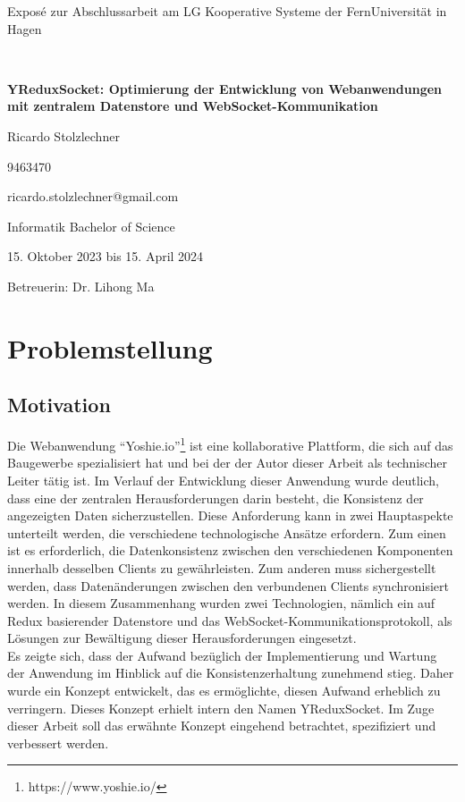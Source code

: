 \documentclass[12pt]{article} %
\begin{document}
\begin{center}
   \baselineskip
   
   Exposé zur Abschlussarbeit am LG Kooperative Systeme der FernUniversität in Hagen
   
   ~
   
   \LARGE\bfseries 
    YReduxSocket: Optimierung der Entwicklung von Webanwendungen mit zentralem Datenstore und WebSocket-Kommunikation

   \large
   Ricardo Stolzlechner
   
   9463470
   
   ricardo.stolzlechner@gmail.com
   
   Informatik Bachelor of Science
   
   15. Oktober 2023 bis 15. April 2024
   
   Betreuerin: Dr. Lihong Ma
\end{center}

\section{Problemstellung}

\subsection{Motivation}
\label{motivation}

Die Webanwendung "`Yoshie.io"'\footnote{https://www.yoshie.io/} ist eine kollaborative Plattform, die sich auf das Baugewerbe spezialisiert hat und bei der der Autor dieser Arbeit als technischer Leiter tätig ist. Im Verlauf der Entwicklung dieser Anwendung wurde deutlich, dass eine der zentralen Herausforderungen darin besteht, die Konsistenz der angezeigten Daten sicherzustellen. Diese Anforderung kann in zwei Hauptaspekte unterteilt werden, die verschiedene technologische Ansätze erfordern. Zum einen ist es erforderlich, die Datenkonsistenz zwischen den verschiedenen Komponenten innerhalb desselben Clients zu gewährleisten. Zum anderen muss sichergestellt werden, dass Datenänderungen zwischen den verbundenen Clients synchronisiert werden. In diesem Zusammenhang wurden zwei Technologien, nämlich ein auf Redux basierender Datenstore und das WebSocket-Kommunikationsprotokoll, als Lösungen zur Bewältigung dieser Herausforderungen eingesetzt.
\\

Es zeigte sich, dass der Aufwand bezüglich der Implementierung und Wartung der Anwendung im Hinblick auf die Konsistenzerhaltung zunehmend stieg. Daher wurde ein Konzept entwickelt, das es ermöglichte, diesen Aufwand erheblich zu verringern. Dieses Konzept erhielt intern den Namen YReduxSocket. Im Zuge dieser Arbeit soll das erwähnte Konzept eingehend betrachtet, spezifiziert und verbessert werden.\\
\end{document}
